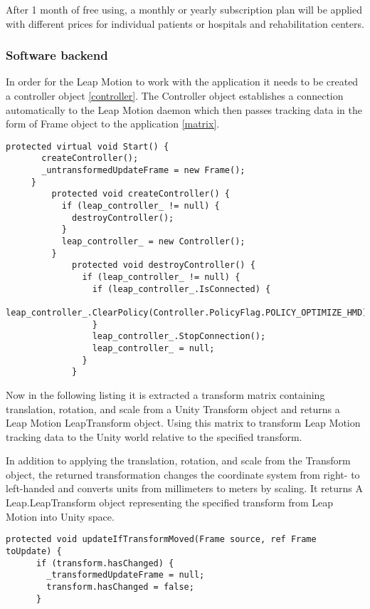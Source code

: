{After 1 month of free using, a monthly or yearly subscription plan will be applied with different prices for individual patients or hospitals and rehabilitation centers.


\subsubsection{Software backend}

In order for the Leap Motion to work with the application it needs to be created a controller object \autoref{controller}. The Controller object establishes a connection automatically to the Leap Motion daemon which then passes tracking data in the form of Frame object to the application \autoref{matrix}.

\begin{lstlisting}[caption={Controller connection and frame setting},label={conroller}]
 protected virtual void Start() {
       createController();
       _untransformedUpdateFrame = new Frame();
     }
         protected void createController() {
           if (leap_controller_ != null) {
             destroyController();
           }
           leap_controller_ = new Controller();
         }
             protected void destroyController() {
               if (leap_controller_ != null) {
                 if (leap_controller_.IsConnected) {
                   leap_controller_.ClearPolicy(Controller.PolicyFlag.POLICY_OPTIMIZE_HMD);
                 }
                 leap_controller_.StopConnection();
                 leap_controller_ = null;
               }
             }
\end{lstlisting}



Now in the following listing it is extracted a transform matrix containing translation, rotation, and scale from a Unity Transform object and returns a Leap Motion LeapTransform object.
Using this matrix to transform Leap Motion tracking data to the Unity world relative to the
specified transform.

In addition to applying the translation, rotation, and scale from the Transform object, the returned
 transformation changes the coordinate system from right- to left-handed and converts units from millimeters to meters
by scaling.
It returns A Leap.LeapTransform object representing the specified transform from Leap Motion into Unity space.
\begin{lstlisting}[caption={Leap Motion tracking matrix data.},label={matrix}]
protected void updateIfTransformMoved(Frame source, ref Frame toUpdate) {
      if (transform.hasChanged) {
        _transformedUpdateFrame = null;
        transform.hasChanged = false;
      }


\end{lstlisting}}
